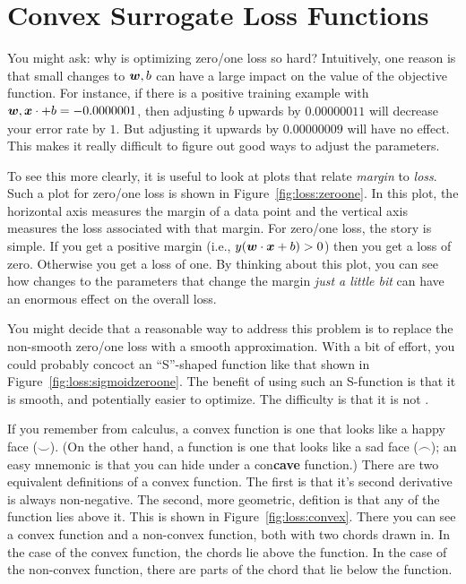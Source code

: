 \section{Convex Surrogate Loss Functions}

You might ask: why is optimizing zero/one loss so hard?  Intuitively,
one reason is that small changes to ${\boldsymbol{w}},b$ can have a large impact on
the value of the objective function.  For instance, if there is a
positive training example with ${\boldsymbol{w}},{\boldsymbol{x}} \cdot +b = -0.0000001$, then
adjusting $b$ upwards by $0.00000011$ will decrease your error rate by
$1$.  But adjusting it upwards by $0.00000009$ will have no effect.
This makes it really difficult to figure out good ways to adjust the
parameters.


To see this more clearly, it is useful to look at plots that relate
\emph{margin} to \emph{loss}.  Such a plot for zero/one loss is shown
in Figure~\ref{fig:loss:zeroone}.  In this plot, the horizontal axis
measures the margin of a data point and the vertical axis measures the
loss associated with that margin.  For zero/one loss, the story is
simple.  If you get a positive margin (i.e., $y({\boldsymbol{w}} \cdot {\boldsymbol{x}}+b)>0$)
then you get a loss of zero.  Otherwise you get a loss of one.  By
thinking about this plot, you can see how changes to the parameters
that change the margin \emph{just a little bit} can have an enormous
effect on the overall loss.


You might decide that a reasonable way to address this problem is to
replace the non-smooth zero/one loss with a smooth approximation.
With a bit of effort, you could probably concoct an ``S''-shaped
function like that shown in Figure~\ref{fig:loss:sigmoidzeroone}.  The
benefit of using such an S-function is that it is smooth, and
potentially easier to optimize.  The difficulty is that it is not
.

If you remember from calculus, a convex function is one that looks
like a happy face ($\smile$).  (On the other hand, a 
function is one that looks like a sad face ($\frown$); an easy
mnemonic is that you can hide under a con{\bf cave} function.)  There
are two equivalent definitions of a convex function.  The first is
that it's second derivative is always non-negative.  The second, more
geometric, defition is that any  of the function lies
above it.  This is shown in Figure~\ref{fig:loss:convex}.  There you
can see a convex function and a non-convex function, both with two
chords drawn in.  In the case of the convex function, the chords lie
above the function.  In the case of the non-convex function, there are
parts of the chord that lie below the function.

